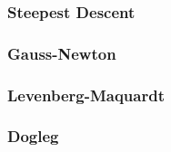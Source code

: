 \subsubsection{Steepest Descent}

\subsubsection{Gauss-Newton}

\subsubsection{Levenberg-Maquardt}

\subsubsection{Dogleg}


